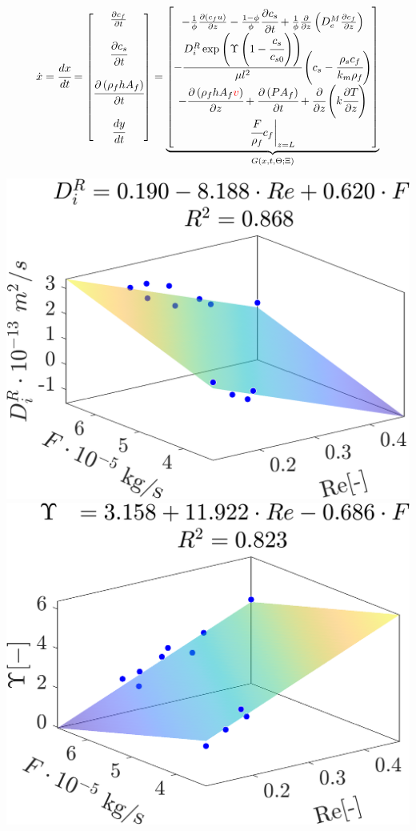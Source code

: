 \documentclass[a0,portrait]{a0poster}
\begin{document}
\begin{multicols}{2}
\begin{tcolorbox}[width=\linewidth, boxrule=0mm, sharp corners=all, colback=white]
\begin{align*}
	\dot{x} = \cfrac{d x}{d t} = 
	\begin{bmatrix}
		\frac{\partial c_f}{\partial t} \\
		\\
		\cfrac{\partial c_s}{\partial t} \\
		\\
		\cfrac{\partial \left(\rho_f h A_f\right)}{\partial t} \\
		\\
		\cfrac{d y}{d t}
	\end{bmatrix}
	=
\underbrace{\begin{bmatrix}
		-\frac{1}{\phi} \frac{\partial \left( c_f u\right)}{\partial z} - \frac{1-\phi}{\phi} \cfrac{\partial c_s}{\partial t} + \frac{1}{\phi} \frac{\partial}{\partial z} \left( D^M_e \frac{\partial c_f}{\partial z} \right) \\
		-\cfrac{ D_i^R \exp \left( \Upsilon \left( 1-\cfrac{ c_s }{c_{s0}} \right) \right) }{ \mu l^2 } \left( c_s  - \cfrac{\rho_s c_f }{ k_m \rho_f }  \right) \\
		- \cfrac{\partial \left( \rho_f h A_f {\color{red}v} \right)}{\partial z} + \cfrac{\partial \left(P A_f\right)}{\partial t} + \cfrac{\partial}{\partial z} \left( k \cfrac{\partial T}{\partial z} \right) \\
		\cfrac{F}{\rho_f} c_f \biggr\rvert_{z=L}
	\end{bmatrix}}_{G(x,t,\Theta;\Xi)}
\end{align*}

\begin{center}\vspace{0.5cm}
	\includegraphics[width=0.49\linewidth]{Di_Re_F.png}
	\hfill
	\includegraphics[width=0.49\linewidth]{Gamma_Re_F.png}
\end{center}%


\end{tcolorbox}
\end{multicols}
\end{document}
